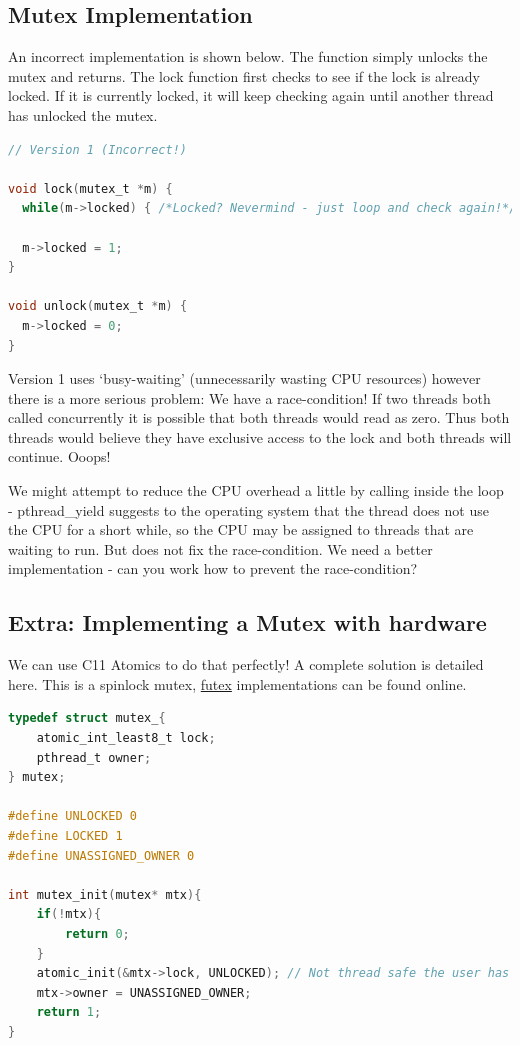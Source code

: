 \subsection{Mutex Implementation}

An incorrect implementation is shown below.
The  function simply unlocks the mutex and returns.
The lock function first checks to see if the lock is already locked.
If it is currently locked, it will keep checking again until another thread has unlocked the mutex.

\begin{lstlisting}[language=C]
// Version 1 (Incorrect!)

void lock(mutex_t *m) {
  while(m->locked) { /*Locked? Nevermind - just loop and check again!*/ }

  m->locked = 1;
}

void unlock(mutex_t *m) {
  m->locked = 0;
}
\end{lstlisting}

Version 1 uses `busy-waiting' (unnecessarily wasting CPU resources) however there is a more serious problem: We have a race-condition! If two threads both called  concurrently it is possible that both threads would read  as zero.
Thus both threads would believe they have exclusive access to the lock and both threads will continue. Ooops!

We might attempt to reduce the CPU overhead a little by calling  inside the loop - pthread\_yield suggests to the operating system that the thread does not use the CPU for a short while, so the CPU may be assigned to threads that are waiting to run.
But does not fix the race-condition. We need a better implementation - can you work how to prevent the race-condition?


\subsection{Extra: Implementing a Mutex with hardware}

We can use C11 Atomics to do that perfectly!
A complete solution is detailed here.
This is a spinlock mutex, \href{https://locklessinc.com/articles/mutex_cv_futex/}{futex} implementations can be found online.

\begin{lstlisting}[language=C]
typedef struct mutex_{
    atomic_int_least8_t lock;
    pthread_t owner;
} mutex;

#define UNLOCKED 0
#define LOCKED 1
#define UNASSIGNED_OWNER 0

int mutex_init(mutex* mtx){
    if(!mtx){
        return 0;
    }
    atomic_init(&mtx->lock, UNLOCKED); // Not thread safe the user has to take care of this
    mtx->owner = UNASSIGNED_OWNER;
    return 1;
}
\end{lstlisting}

